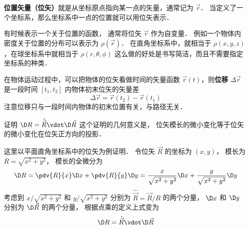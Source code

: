 
\textbf{位置矢量（位矢）}就是从坐标原点指向某一点的矢量，通常记为 $\vec r$． 当定义了一个坐标系，那么坐标系中一点的位置就可以用位矢表示．

有时候表示一个关于位置的函数， 通常将位矢 $\vec r$ 作为自变量． 例如一个物体内密度关于位置的分布可以表示为 $\rho(\vec r)$． 在直角坐标系中，就相当于 $\rho(x,y,z)$，在球坐标系中就相当于 $\rho(r,\theta,\phi)$ 这么做的好处是书写简洁，而且不需要指定坐标系的种类．

在物体运动过程中，可以把物体的位矢看做时间的矢量函数 $\vec r(t)$，则\textbf{位移} $\Delta \vec r$ 是一段时间 $[t_1,t_2]$ 内物体初末位矢的矢量差
\begin{equation}
\Delta \vec r = \vec r(t_2) - \vec r(t_1)
\end{equation}
注意位移只与一段时间内物体的初末位置有关，与路径无关．

\begin{exam}{证明 $\D R = \hat{\vec R} \vdot \D \vec R$}\label{Disp_ex1}
这个证明的几何意义是， 位矢模长的微小变化等于位矢的微小变化在位矢正方向的投影．

这里以平面直角坐标系中的位矢为例证明． 令位矢 $\vec R$ 的坐标为 $(x, y)$， 模长为 $R = \sqrt{x^2 + y^2}$，
模长的全微分为
\begin{equation}
\D R = \pdv{R}{x} \D x + \pdv{R}{y} \D y = \frac{x}{\sqrt{x^2 + y^2}} \D x + \frac{y}{\sqrt{x^2 + y^2}} \D y
\end{equation}
考虑到 $x/\sqrt{x^2 + y^2}$ 和 $y/\sqrt{x^2 + y^2}$ 分别为 $\hat {\vec R} = \vec R/R$ 的两个分量， $\D x$ 和 $\D y$ 分别为 $\D \vec R$ 的两个分量， 根据点乘的定义上式变为
\begin{equation}
\D R = \hat{\vec R} \vdot \D \vec R
\end{equation}
\end{exam}









